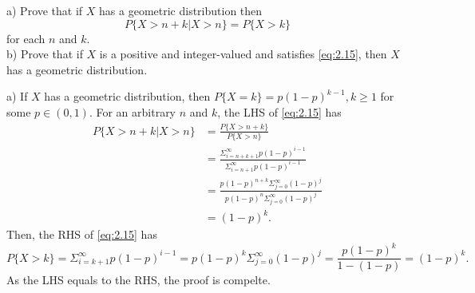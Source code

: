 \begin{exercise}
  a) Prove that if $X$ has a geometric distribution then
  \begin{equation}\label{eq:2.15}
    P\{X>n+k|X>n\} = P\{X>k\}
  \end{equation}
  for each $n$ and $k$. \\
  b) Prove that if $X$ is a positive and integer-valued and satisfies \eqref{eq:2.15}, then $X$ has a geometric distribution.
\end{exercise}
\begin{solution}
  a) If $X$ has a geometric distribution, then $P\{X=k\}=p(1-p)^{k-1}, k\geq 1$ for some $p\in(0, 1)$. For an arbitrary $n$ and $k$, the LHS of \eqref{eq:2.15} has
  \begin{align*}
    P\{X>n+k|X>n\} &= \frac{P\{X>n+k\}}{P\{X>n\}} \\
      &= \frac{\Sigma_{i=n+k+1}^\infty p(1-p)^{i-1}}{\Sigma_{i=n+1}^\infty p(1-p)^{i-1}} \\
      &= \frac{p(1-p)^{n+k}\Sigma_{j=0}^\infty(1-p)^j}{p(1-p)^n\Sigma_{j=0}^\infty(1-p)^j} \\
      &= (1-p)^k.
  \end{align*}
  Then, the RHS of \eqref{eq:2.15} has
  \[
    P\{X>k\} = \Sigma_{i=k+1}^\infty p(1-p)^{i-1} = p(1-p)^k\Sigma_{j=0}^\infty(1-p)^j = \frac{p(1-p)^k}{1-(1-p)} = (1-p)^k.
  \]
  As the LHS equals to the RHS, the proof is compelte. \\


\end{solution}
